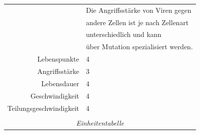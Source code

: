 \documentclass[11pt]{article}
\begin{document}
\begin{tabular}{|r|l|}
			& Die Angriffsst\"arke von Viren gegen\\
			& andere Zellen ist je nach Zellenart\\
			& unterschiedlich  und kann\\
			& \"uber Mutation spezialisiert werden.\\\hline
Lebenspunkte	& 4\\\hline
Angriffsst\"arke	& 3\\\hline
Lebensdauer		& 4\\\hline
Geschwindigkeit	& 4\\\hline
Teilungsgeschwindigkeit	& 4\\\hline
\multicolumn{2}{c}{}\\
\multicolumn{2}{c}{\textit{\large{Einheitentabelle}}}\\
\end{tabular}
\end{document}

